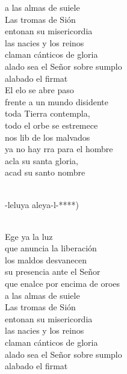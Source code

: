 \begin{cancion}
	a las almas de suiele\\
	Las tromas de Sión \\
entonan su misericordia\\
	las nacies y los reinos \\
claman cánticos de gloria\\
	alado sea el Señor sobre sumplo\\
	alabado el firmat\\
	El elo se abre paso \\
frente a un mundo disidente\\
	toda  Tierra contempla, \\
todo el orbe se estremece\\
	nos lib de los malvados  \\
	ya no hay rra para el hombre\\
	acla su santa gloria,\\
	 acad su santo nombre\\\jump\\
	\begin{chorus}%
	-leluya aleya-l-*)\\
	\end{chorus}%
	\jump\\
	Ege ya la luz \\
que anuncia la liberación\\
	los maldos desvanecen \\
su presencia ante el Señor\\
	que enalce por encima de oroes\\
	a las almas de suiele\\
	Las tromas de Sión \\
entonan su misericordia\\
	las nacies y los reinos \\
claman cánticos de gloria\\
	alado sea el Señor sobre sumplo\\
	alabado el firmat\\

\end{cancion}
